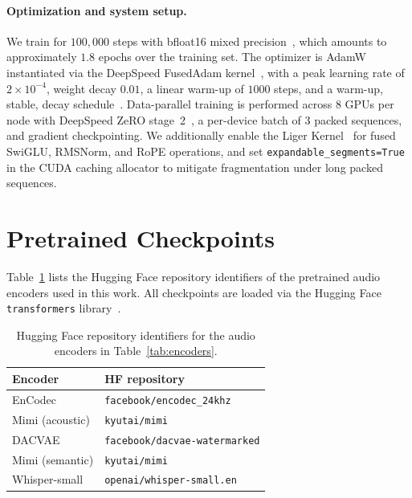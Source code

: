 \paragraph{Optimization and system setup.}
We train for $100{,}000$ steps with bfloat16 mixed precision~\cite{Ka20}, which amounts to approximately $1.8$ epochs over the training set.
The optimizer is AdamW~\cite{LH19} instantiated via the DeepSpeed FusedAdam kernel~\cite{DS20}, with a peak learning rate of $2 \times 10^{-4}$, weight decay $0.01$, a linear warm-up of $1000$ steps, and a warm-up, stable, decay schedule~\cite{HF23}.
Data-parallel training is performed across $8$ GPUs per node with DeepSpeed ZeRO stage~2~\cite{Ra20,DS20}, a per-device batch of $3$ packed sequences, and gradient checkpointing.
We additionally enable the Liger Kernel~\cite{Ho24} for fused SwiGLU, RMSNorm, and RoPE operations, and set \texttt{expandable\_segments=True} in the CUDA caching allocator to mitigate fragmentation under long packed sequences.

\section{Pretrained Checkpoints}
\label{app:checkpoints}

Table~\ref{tab:encoder-checkpoints} lists the Hugging Face repository identifiers of the pretrained audio encoders used in this work.
All checkpoints are loaded via the Hugging Face \texttt{transformers} library~\cite{HF23}.

\begin{table}[t]
\centering
\caption{Hugging Face repository identifiers for the audio encoders in Table~\ref{tab:encoders}.}
\label{tab:encoder-checkpoints}
\small
\begin{tabular}{ll}
\toprule
Encoder            & HF repository \\
\midrule
EnCodec            & \texttt{facebook/encodec\_24khz} \\
Mimi (acoustic)    & \texttt{kyutai/mimi} \\
DACVAE             & \texttt{facebook/dacvae-watermarked} \\
Mimi (semantic)    & \texttt{kyutai/mimi} \\
Whisper-small      & \texttt{openai/whisper-small.en} \\
\bottomrule
\end{tabular}
\end{table}
